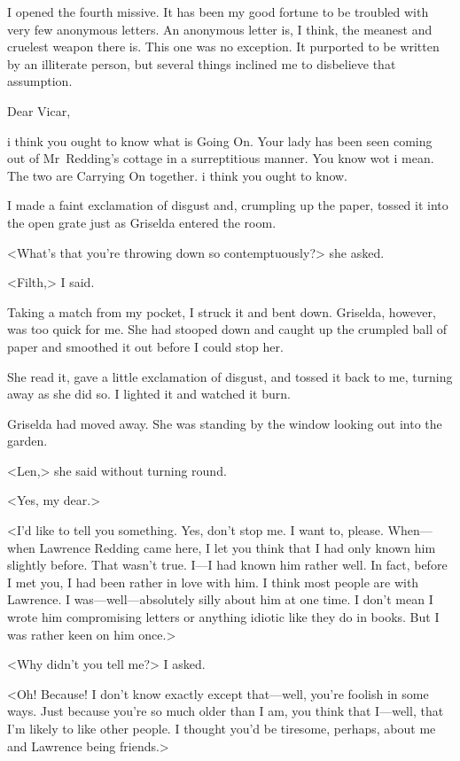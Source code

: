 I opened the fourth missive. It has been my good fortune to be troubled with very few anonymous letters. An anonymous letter is, I think, the meanest and cruelest weapon there is. This one was no exception. It purported to be written by an illiterate person, but several things inclined me to disbelieve that assumption.

\begin{mail}{}{Dear Vicar,}

i think you ought to know what is Going On. Your lady has been seen coming out of Mr~Redding's cottage in a surreptitious manner. You know wot i mean. The two are Carrying On together. i think you ought to know.

\end{mail}

I made a faint exclamation of disgust and, crumpling up the paper, tossed it into the open grate just as Griselda entered the room.

<What's that you're throwing down so contemptuously?> she asked.

<Filth,> I said.

Taking a match from my pocket, I struck it and bent down. Griselda, however, was too quick for me. She had stooped down and caught up the crumpled ball of paper and smoothed it out before I could stop her.

She read it, gave a little exclamation of disgust, and tossed it back to me, turning away as she did so. I lighted it and watched it burn.

Griselda had moved away. She was standing by the window looking out into the garden.

<Len,> she said without turning round.

<Yes, my dear.>

<I'd like to tell you something. Yes, don't stop me. I want to, please. When—when Lawrence Redding came here, I let you think that I had only known him slightly before. That wasn't true. I—I had known him rather well. In fact, before I met you, I had been rather in love with him. I think most people are with Lawrence. I was—well—absolutely silly about him at one time. I don't mean I wrote him compromising letters or anything idiotic like they do in books. But I was rather keen on him once.>

<Why didn't you tell me?> I asked.

<Oh! Because! I don't know exactly except that—well, you're foolish in some ways. Just because you're so much older than I am, you think that I—well, that I'm likely to like other people. I thought you'd be tiresome, perhaps, about me and Lawrence being friends.>

